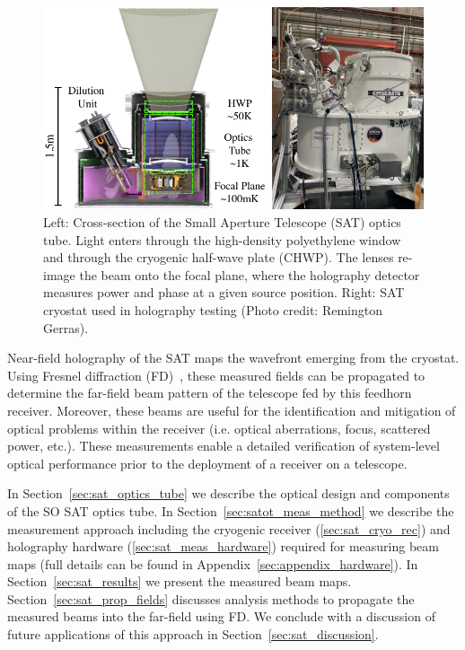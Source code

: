 \begin{figure}[t!]
    \centering
    \includegraphics[width = \textwidth]{Figures/sat_optics.pdf}
    \caption{Left: Cross-section of the Small Aperture Telescope (SAT) optics tube.  Light enters through the high-density polyethylene window and through the cryogenic half-wave plate (CHWP).  The lenses re-image the beam onto the focal plane, where the holography detector measures power and phase at a given source position.  Right: SAT cryostat used in holography testing (Photo credit: Remington Gerras).}
    \label{fig:sat_optics}
\end{figure}

Near-field holography of the SAT maps the wavefront emerging from the cryostat.  Using Fresnel diffraction (FD)~\cite{Goodman2005-ne}, these measured fields can be propagated to determine the far-field beam pattern of the telescope fed by this feedhorn receiver.  Moreover, these beams are useful for the identification and mitigation of optical problems within the receiver (i.e. optical aberrations, focus, scattered power, etc.).  These measurements enable a detailed verification of system-level optical performance prior to the deployment of a receiver on a telescope.

In Section~\ref{sec:sat_optics_tube} we describe the optical design and components of the SO SAT optics tube.  In Section~\ref{sec:satot_meas_method} we describe the measurement approach including the cryogenic receiver (\ref{sec:sat_cryo_rec}) and holography hardware (\ref{sec:sat_meas_hardware}) required for measuring beam maps (full details can be found in Appendix~\ref{sec:appendix_hardware}).  In Section~\ref{sec:sat_results} we present the measured beam maps.   Section~\ref{sec:sat_prop_fields} discusses analysis methods to propagate the measured beams into the far-field using FD.  We conclude with a discussion of future applications of this approach in Section~\ref{sec:sat_discussion}.  
